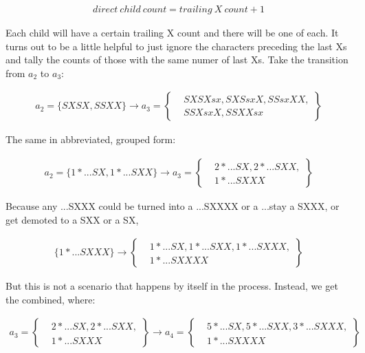 \documentclass{article}
\begin{document}
\begin{align}
  direct~child~count=trailing~X~count + 1
\end{align}

Each child will have a certain trailing X count and there will be one of each.  It turns out to be a little helpful to just ignore the characters preceding the last Xs and tally the counts of those with the same numer of last Xs.  Take the transition from $a_2$ to $a_3$:

\begin{align*}
  a_2 = \{SXSX,SSXX\} \rightarrow a_3 =
  \left\{
    \begin{aligned}
      & SXSXsx, SXSsxX, SSsxXX, \\
      & SSXsxX, SSXXsx
    \end{aligned}
  \right\}
\end{align*}

The same in abbreviated, grouped form:

\begin{align*}
  a_2 = \{1 * ...SX,1 * ...SXX\} \rightarrow a_3 =
  \left\{
    \begin{aligned}
      & 2 * ...SX, 2 * ...SXX, \\
      & 1 * ...SXXX
    \end{aligned}
  \right\}
\end{align*}

Because any ...SXXX could be turned into a ...SXXXX or a ...stay a SXXX, or get demoted to a SXX or a SX,

\begin{align*}
  \{1 * ...SXXX\} \rightarrow
  \left\{
    \begin{aligned}
      & 1 * ...SX, 1 * ...SXX, 1 * ...SXXX, \\
      & 1 * ...SXXXX
    \end{aligned}
  \right\}
\end{align*}

But this is not a scenario that happens by itself in the process.  Instead, we get the combined, where:



\begin{align*}
  a_3 = 
  \left\{
    \begin{aligned}
      & 2 * ...SX, 2 * ...SXX, \\
      & 1 * ...SXXX
    \end{aligned}
  \right\} \rightarrow a_4 =
  \left\{
    \begin{aligned}
      & 5 * ...SX, 5 * ...SXX, 3 * ...SXXX, \\
      & 1 * ...SXXXX
    \end{aligned}
  \right\}
\end{align*}
\end{document}
